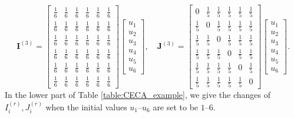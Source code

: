 \documentclass{article}
\newcommand{\vI}{\mathbf{I}}
\newcommand{\vJ}{\mathbf{J}}
\newcommand{\ro}{{(r)}}
\theoremstyle{plain}
\theoremstyle{definition}
\begin{document}
$$
\vI^{(3)}
=
\left[
\begin{array}{cccccc}
    \frac{1}{6} & \frac{1}{6} & \frac{1}{6} & \frac{1}{6} & \frac{1}{6} & \frac{1}{6} \\
    \frac{1}{6} & \frac{1}{6} & \frac{1}{6} & \frac{1}{6} & \frac{1}{6} & \frac{1}{6} \\
    \frac{1}{6} & \frac{1}{6} & \frac{1}{6} & \frac{1}{6} & \frac{1}{6} & \frac{1}{6} \\
    \frac{1}{6} & \frac{1}{6} & \frac{1}{6} & \frac{1}{6} & \frac{1}{6} & \frac{1}{6} \\
    \frac{1}{6} & \frac{1}{6} & \frac{1}{6} & \frac{1}{6} & \frac{1}{6} & \frac{1}{6} \\
    \frac{1}{6} & \frac{1}{6} & \frac{1}{6} & \frac{1}{6} & \frac{1}{6} & \frac{1}{6}
\end{array}
\right]
\left[
\begin{array}{c}
     u_1  \\
     u_2  \\
     u_3  \\
     u_4  \\
     u_5  \\
     u_6
\end{array}
\right],\quad
\vJ^{(3)}
=
\left[
\begin{array}{cccccc}
    0 & \frac{1}{5} & \frac{1}{5} & \frac{1}{5} & \frac{1}{5} & \frac{1}{5} \\
    \frac{1}{5} & 0 & \frac{1}{5} & \frac{1}{5} & \frac{1}{5} & \frac{1}{5} \\
    \frac{1}{5} & \frac{1}{5} & 0 & \frac{1}{5} & \frac{1}{5} & \frac{1}{5} \\
    \frac{1}{5} & \frac{1}{5} & \frac{1}{5} & 0 & \frac{1}{5} & \frac{1}{5} \\
    \frac{1}{5} & \frac{1}{5} & \frac{1}{5} & \frac{1}{5} & 0 & \frac{1}{5} \\
    \frac{1}{5} & \frac{1}{5} & \frac{1}{5} & \frac{1}{5} & \frac{1}{5} & 0
\end{array}
\right]
\left[
\begin{array}{c}
     u_1  \\
     u_2  \\
     u_3  \\
     u_4  \\
     u_5  \\
     u_6
\end{array}
\right].
$$
\endgroup
{In the lower part of Table \ref{table:CECA_example}, we give the changes of $I^\ro_i,J^\ro_i$ when the initial values $u_1$--$u_6$ are set to be $1$--$6$.}
\end{document}
